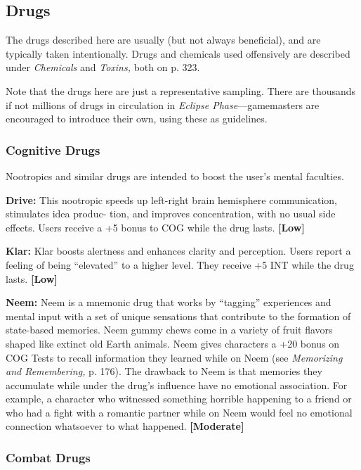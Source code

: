 \subsection{Drugs}

The drugs described here are usually (but not always 
beneficial), and are typically taken intentionally. Drugs 
and chemicals used offensively are described under 
\textit{Chemicals }and\textit{ Toxins,} both on p. 323.

Note that the drugs here are just a representative 
sampling. There are thousands if not millions of 
drugs in circulation in \textit{Eclipse Phase}—gamemasters 
are encouraged to introduce their own, using these 
as guidelines.

\subsubsection{Cognitive Drugs}

Nootropics and similar drugs are intended to boost 
the user's mental faculties.

\textbf{Drive:} This nootropic speeds up left-right brain 
hemisphere communication, stimulates idea produc-
tion, and improves concentration, with no usual side 
effects. Users receive a +5 bonus to COG while the 
drug lasts. \textbf{[Low]}

\textbf{Klar:} Klar boosts alertness and enhances clarity and 
perception. Users report a feeling of being ``elevated'' 
to a higher level. They receive +5 INT while the drug 
lasts. \textbf{[Low]}

\textbf{Neem:} Neem is a mnemonic drug that works by 
``tagging'' experiences and mental input with a set of 
unique sensations that contribute to the formation 
of state-based memories. Neem gummy chews come 
in a variety of fruit flavors shaped like extinct old 
Earth animals. Neem gives characters a +20 bonus 
on COG Tests to recall information they learned 
while on Neem (see \textit{Memorizing and Remembering,}
p. 176). The drawback to Neem is that memories they 
accumulate while under the drug's influence have no 
emotional association. For example, a character who 
witnessed something horrible happening to a friend 
or who had a fight with a romantic partner while on 
Neem would feel no emotional connection whatsoever 
to what happened. \textbf{[Moderate]}

\subsubsection{Combat Drugs}

